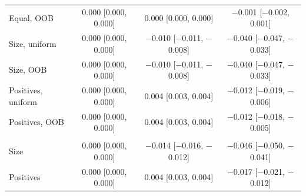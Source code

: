 \begin{tabular}{lccc}
Equal, OOB & 0.000 [0.000, 0.000] & 0.000 [0.000, 0.000] & $-$0.001 [$-$0.002, 0.001] \\
Size, uniform & 0.000 [0.000, 0.000] & $-$0.010 [$-$0.011, $-$0.008] & $-$0.040 [$-$0.047, $-$0.033] \\
Size, OOB & 0.000 [0.000, 0.000] & $-$0.010 [$-$0.011, $-$0.008] & $-$0.040 [$-$0.047, $-$0.033] \\
Positives, uniform & 0.000 [0.000, 0.000] & 0.004 [0.003, 0.004] & $-$0.012 [$-$0.019, $-$0.006] \\
Positives, OOB & 0.000 [0.000, 0.000] & 0.004 [0.003, 0.004] & $-$0.012 [$-$0.018, $-$0.005] \\
\addlinespace
\multicolumn{4}{@{}l}{\textit{Heart, XGBoost}} \\
Size & 0.000 [0.000, 0.000] & $-$0.014 [$-$0.016, $-$0.012] & $-$0.046 [$-$0.050, $-$0.041] \\
Positives & 0.000 [0.000, 0.000] & 0.004 [0.003, 0.004] & $-$0.017 [$-$0.021, $-$0.012] \\
\bottomrule
\end{tabular}
